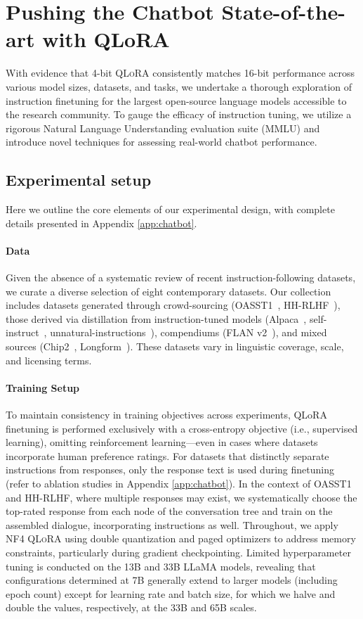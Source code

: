 \section{Pushing the Chatbot State-of-the-art with QLoRA}
\label{sec:pushing}
With evidence that 4-bit \textsc{QLoRA} consistently matches 16-bit performance across various model sizes, datasets, and tasks, we undertake a thorough exploration of instruction finetuning for the largest open-source language models accessible to the research community. To gauge the efficacy of instruction tuning, we utilize a rigorous Natural Language Understanding evaluation suite (MMLU) and introduce novel techniques for assessing real-world chatbot performance.

\subsection{Experimental setup} Here we outline the core elements of our experimental design, with complete details presented in Appendix \ref{app:chatbot}.

\paragraph{Data} Given the absence of a systematic review of recent instruction-following datasets, we curate a diverse selection of eight contemporary datasets. Our collection includes datasets generated through crowd-sourcing (OASST1~\citep{kopf2023openassistant}, HH-RLHF~\citep{bai2022training}), those derived via distillation from instruction-tuned models (Alpaca~\citep{alpaca}, self-instruct~\citep{wang2022self}, unnatural-instructions~\citep{honovich2022unnatural}), compendiums (FLAN v2~\citep{chung2022scaling}), and mixed sources (Chip2~\citep{laion2023}, Longform~\citep{koksal2023longform}). These datasets vary in linguistic coverage, scale, and licensing terms.

\paragraph{Training Setup} To maintain consistency in training objectives across experiments, QLoRA finetuning is performed exclusively with a cross-entropy objective (i.e., supervised learning), omitting reinforcement learning—even in cases where datasets incorporate human preference ratings. For datasets that distinctly separate instructions from responses, only the response text is used during finetuning (refer to ablation studies in Appendix \ref{app:chatbot}). In the context of OASST1 and HH-RLHF, where multiple responses may exist, we systematically choose the top-rated response from each node of the conversation tree and train on the assembled dialogue, incorporating instructions as well. Throughout, we apply NF4 \textsc{QLoRA} using double quantization and paged optimizers to address memory constraints, particularly during gradient checkpointing. Limited hyperparameter tuning is conducted on the 13B and 33B LLaMA models, revealing that configurations determined at 7B generally extend to larger models (including epoch count) except for learning rate and batch size, for which we halve and double the values, respectively, at the 33B and 65B scales.

